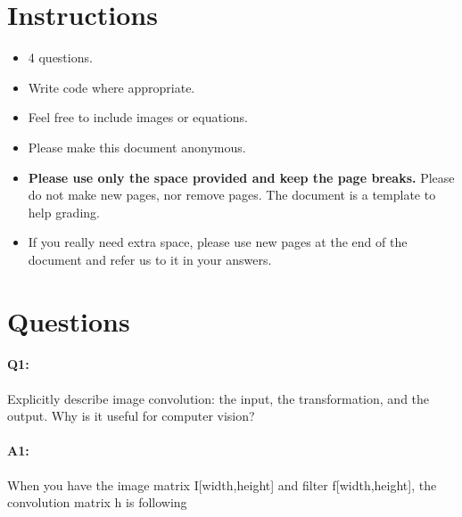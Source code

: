 	\maketitle
	\vspace{-3cm}
	\thispagestyle{fancy}
	
	\section*{Instructions}
	\begin{itemize}
		\item 4 questions.
		\item Write code where appropriate.
		\item Feel free to include images or equations.
		\item Please make this document anonymous.
		\item \textbf{Please use only the space provided and keep the page breaks.} Please do not make new pages, nor remove pages. The document is a template to help grading.
		\item If you really need extra space, please use new pages at the end of the document and refer us to it in your answers.
	\end{itemize}

	\section*{Questions}
	
	\paragraph{Q1:} Explicitly describe image convolution: the input, the transformation, and the output. Why is it useful for computer vision?
	
	\paragraph{A1:} 
	When you have the image matrix I[width,height] and filter f[width,height],
	the convolution matrix h is following 
	
